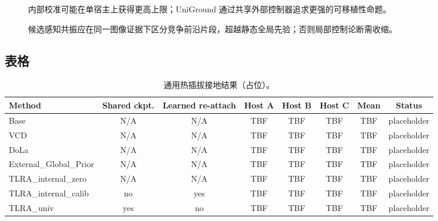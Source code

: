 \begin{figure}[t]
  \centering
  \caption{内部校准可能在单宿主上获得更高上限；UniGround 通过共享外部控制器追求更强的可移植性命题。}
  \label{fig:tradeoff}
\end{figure}

\begin{figure}[t]
  \centering
  \caption{候选感知共振应在同一图像证据下区分竞争前沿片段，超越静态全局先验；否则局部控制论断需收缩。}
  \label{fig:global}
\end{figure}

\subsection{表格}

\begin{table}[t]
  \caption{通用热插拔接地结果（占位）。}
  \label{tab:hotswap}
  \centering
  \small
  \begin{tabular}{@{}lccccccc@{}}
    \toprule
    Method & Shared ckpt. & Learned re-attach & Host A & Host B & Host C & Mean & Status \\
    \midrule
    Base & N/A & N/A & TBF & TBF & TBF & TBF & placeholder \\
    VCD & N/A & N/A & TBF & TBF & TBF & TBF & placeholder \\
    DoLa & N/A & N/A & TBF & TBF & TBF & TBF & placeholder \\
    External\_Global\_Prior & N/A & N/A & TBF & TBF & TBF & TBF & placeholder \\
    TLRA\_internal\_zero & N/A & N/A & TBF & TBF & TBF & TBF & placeholder \\
    TLRA\_internal\_calib & no & yes & TBF & TBF & TBF & TBF & placeholder \\
    TLRA\_univ & yes & no & TBF & TBF & TBF & TBF & placeholder \\
    \bottomrule
  \end{tabular}
\end{table}

